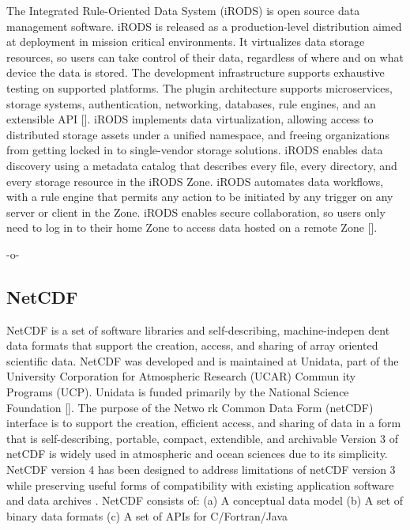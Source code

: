 The Integrated Rule-Oriented Data System (iRODS) is open source data
management software. iRODS is released as a production-level
distribution aimed at deployment in mission critical environments. It
virtualizes data storage resources, so users can take control of their
data, regardless of where and on what device the data is stored. The
development infrastructure supports exhaustive testing on supported
platforms. The plugin architecture supports microservices, storage
systems, authentication, networking, databases, rule engines, and an
extensible API [\cite{irods-www}].  iRODS implements data
virtualization, allowing access to distributed storage assets under a
unified namespace, and freeing organizations from getting locked in to
single-vendor storage solutions. iRODS enables data discovery using a
metadata catalog that describes every file, every directory, and every
storage resource in the iRODS Zone. iRODS automates data workflows,
with a rule engine that permits any action to be initiated by any
trigger on any server or client in the Zone. iRODS enables secure
collaboration, so users only need to log in to their home Zone to
access data hosted on a remote Zone [\cite{github-irods-www}].

     -o-


\subsection{NetCDF}

NetCDF is a set of software libraries and self-describing,
machine-indepen dent data formats that support the creation, access,
and sharing of array oriented scientific data. NetCDF was developed
and is maintained at Unidata, part of the University Corporation for
Atmospheric Research (UCAR) Commun ity Programs (UCP). Unidata is
funded primarily by the National Science Foundation
\cite{paper-netCDF} [\cite{www-netcdf}]. The purpose of the Netwo rk
Common Data Form (netCDF) interface is to support the creation,
efficient access, and sharing of data in a form that is
self-describing, portable, compact, extendible, and archivable Version
3 of netCDF is widely used in atmospheric and ocean sciences due to
its simplicity. NetCDF version 4 has been designed to address
limitations of netCDF version 3 while preserving useful forms of
compatibility with existing application software and data archives
\cite{paper-netCDF}.  NetCDF consists of: (a) A conceptual data model
(b) A set of binary data formats (c) A set of APIs for C/Fortran/Java

